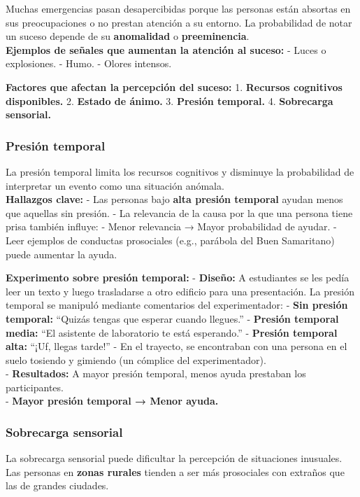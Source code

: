 \documentclass[
]{book}
\begin{document}
Muchas emergencias pasan desapercibidas porque las personas están absortas en sus preocupaciones o no prestan atención a su entorno. La probabilidad de notar un suceso depende de su \textbf{anomalidad} o \textbf{preeminencia}.\\
\textbf{Ejemplos de señales que aumentan la atención al suceso:}
- Luces o explosiones.
- Humo.
- Olores intensos.

\textbf{Factores que afectan la percepción del suceso:}
1. \textbf{Recursos cognitivos disponibles.}
2. \textbf{Estado de ánimo.}
3. \textbf{Presión temporal.}
4. \textbf{Sobrecarga sensorial.}

\subsubsection{Presión temporal}\label{presiuxf3n-temporal}

La presión temporal limita los recursos cognitivos y disminuye la probabilidad de interpretar un evento como una situación anómala.\\
\textbf{Hallazgos clave:}
- Las personas bajo \textbf{alta presión temporal} ayudan menos que aquellas sin presión.
- La relevancia de la causa por la que una persona tiene prisa también influye:
- Menor relevancia → Mayor probabilidad de ayudar.
- Leer ejemplos de conductas prosociales (e.g., parábola del Buen Samaritano) puede aumentar la ayuda.

\textbf{Experimento sobre presión temporal:}
- \textbf{Diseño:} A estudiantes se les pedía leer un texto y luego trasladarse a otro edificio para una presentación. La presión temporal se manipuló mediante comentarios del experimentador:
- \textbf{Sin presión temporal:} ``Quizás tengas que esperar cuando llegues.''
- \textbf{Presión temporal media:} ``El asistente de laboratorio te está esperando.''
- \textbf{Presión temporal alta:} ``¡Uf, llegas tarde!''
- En el trayecto, se encontraban con una persona en el suelo tosiendo y gimiendo (un cómplice del experimentador).\\
- \textbf{Resultados:} A mayor presión temporal, menos ayuda prestaban los participantes.\\
- \textbf{Mayor presión temporal → Menor ayuda.}

\subsubsection{Sobrecarga sensorial}\label{sobrecarga-sensorial}

La sobrecarga sensorial puede dificultar la percepción de situaciones inusuales. Las personas en \textbf{zonas rurales} tienden a ser más prosociales con extraños que las de grandes ciudades.
\end{document}
